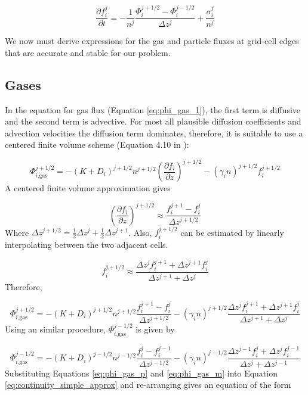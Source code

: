 \begin{equation} \label{eq:continuity_simple_approx}
  \frac{\partial f_i^j}{\partial t} = - \frac{1}{n^{j}} \frac{\Phi_{i}^{j+1/2} - \Phi_{i}^{j-1/2}}{\Delta z^j} + \frac{\sigma_i^j}{n^{j}}
\end{equation}

We now must derive expressions for the gas and particle fluxes at grid-cell edges that are accurate and stable for our problem. 

\subsection{Gases} \label{sec:FV_gases}

In the equation for gas flux (Equation \eqref{eq:phi_gas_1}), the first term is diffusive and the second term is advective. For most all plausible diffusion coefficients and advection velocities the diffusion term dominates, therefore, it is suitable to use a centered finite volume scheme (Equation 4.10 in \citet{Leveque_2002}):

\begin{equation}
  \Phi_{i\text{,gas}}^{j+1/2} = - ( K + D_{i})^{j+1/2} n^{j+1/2} \left( \frac{\partial f_{i}}{\partial z} \right)^{j+1/2} - (\gamma_{i} n)^{j+1/2} f_{i}^{j+1/2}
\end{equation}
A centered finite volume approximation gives 

$$\left( \frac{\partial f_{i}}{\partial z} \right)^{j+1/2} \approx \frac{f_i^{j+1} - f_i^{j}}{\Delta z^{j+1/2}}$$
Where $\Delta z^{j+1/2} = \frac{1}{2}\Delta z^j + \frac{1}{2} \Delta z^{j+1}$. Also, $f_{i}^{j+1/2}$ can be estimated by linearly interpolating between the two adjacent cells.

$$f_{i}^{j+1/2} \approx \frac{\Delta z^{j}f_i^{j+1} + \Delta z^{j+1} f_i^{j}}{\Delta z^{j+1}+\Delta z^{j}}$$
Therefore,

\begin{equation} \label{eq:phi_gas_p}
  \Phi_{i\text{,gas}}^{j+1/2} = - ( K + D_{i})^{j+1/2} n^{j+1/2} \frac{f_i^{j+1} - f_i^{j}}{\Delta z^{j+1/2}} - (\gamma_{i} n)^{j+1/2} \frac{\Delta z^{j}f_i^{j+1} + \Delta z^{j+1} f_i^{j}}{\Delta z^{j+1}+\Delta z^{j}}
\end{equation}
Using an similar procedure, $\Phi_{i\text{,gas}}^{j-1/2}$ is given by

\begin{equation} \label{eq:phi_gas_m}
  \Phi_{i\text{,gas}}^{j-1/2} = - ( K + D_{i})^{j-1/2} n^{j-1/2} \frac{f_i^{j} - f_i^{j-1}}{\Delta z^{j-1/2}} - (\gamma_{i} n)^{j-1/2} \frac{\Delta z^{j-1}f_i^{j} + \Delta z^{j} f_i^{j-1}}{\Delta z^{j}+\Delta z^{j-1}}
\end{equation}
Substituting Equations \eqref{eq:phi_gas_p} and \eqref{eq:phi_gas_m} into Equation \eqref{eq:continuity_simple_approx} and re-arranging gives an equation of the form

